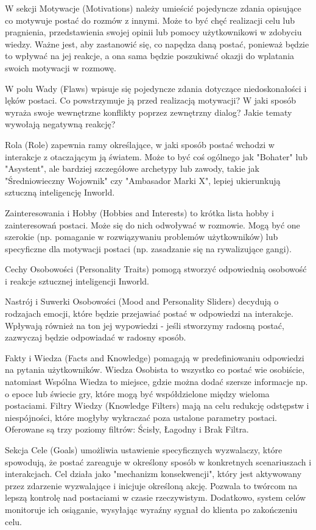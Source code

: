 W sekcji Motywacje (Motivations) należy umieścić pojedyncze zdania opisujące co motywuje postać do
rozmów z innymi. Może to być chęć realizacji celu lub pragnienia, przedstawienia swojej opinii lub
pomocy użytkownikowi w zdobyciu wiedzy. Ważne jest, aby zastanowić się, co napędza daną postać, ponieważ
będzie to wpływać na jej reakcje, a ona sama będzie poszukiwać okazji do wplatania swoich motywacji w rozmowę.

W polu Wady (Flaws) wpisuje się pojedyncze zdania dotyczące niedoskonałości i lęków postaci. Co
powstrzymuje ją przed realizacją motywacji? W jaki sposób wyraża swoje wewnętrzne konflikty poprzez
zewnętrzny dialog? Jakie tematy wywołają negatywną reakcję?

Rola (Role) zapewnia ramy określające, w jaki sposób postać wchodzi w interakcje z otaczającym ją
światem. Może to być coś ogólnego jak "Bohater" lub "Asystent", ale bardziej szczegółowe archetypy lub
zawody, takie jak "Średniowieczny Wojownik" czy "Ambasador Marki X", lepiej ukierunkują sztuczną
inteligencję Inworld.

Zainteresowania i Hobby (Hobbies and Interests) to krótka lista hobby i zainteresowań postaci. Może
się do nich odwoływać w rozmowie. Mogą być one szerokie (np. pomaganie w rozwiązywaniu problemów
użytkowników) lub specyficzne dla motywacji postaci (np. zasadzanie się na rywalizujące gangi).

Cechy Osobowości (Personality Traits) pomogą stworzyć odpowiednią osobowość i reakcje sztucznej
inteligencji Inworld.

Nastrój i Suwerki Osobowości (Mood and Personality Sliders) decydują o rodzajach emocji, które będzie
przejawiać postać w odpowiedzi na interakcje. Wpływają również na ton jej wypowiedzi - jeśli stworzymy radosną postać, zazwyczaj będzie odpowiadać w radosny sposób.

Fakty i Wiedza (Facts and Knowledge) pomagają w predefiniowaniu odpowiedzi na pytania użytkowników.
Wiedza Osobista to wszystko co postać wie osobiście, natomiast Wspólna Wiedza to miejsce, gdzie można
dodać szersze informacje np. o epoce lub świecie gry, które mogą być współdzielone między wieloma
postaciami. Filtry Wiedzy (Knowledge Filters) mają na celu redukcję odstępstw i niespójności, które
mogłyby wykraczać poza ustalone parametry postaci. Oferowane są trzy poziomy filtrów: Ścisły,
Łagodny i Brak Filtra.

Sekcja Cele (Goals) umożliwia ustawienie specyficznych wyzwalaczy, które spowodują, że postać
zareaguje w określony sposób w konkretnych scenariuszach i interakcjach. Cel działa jako "mechanizm
konsekwencji", który jest aktywowany przez zdarzenie wyzwalające i inicjuje określoną akcję. Pozwala
to twórcom na lepszą kontrolę nad postaciami w czasie rzeczywistym. Dodatkowo, system celów
monitoruje ich osiąganie, wysyłając wyraźny sygnał do klienta po zakończeniu celu.

